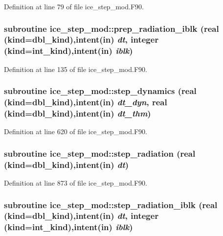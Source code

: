 Definition at line 79 of file ice\_\-step\_\-mod.F90.\hypertarget{namespaceice__step__mod_a39289f79dee62dcc8102504d118c616c}{
\subsubsection[{prep\_\-radiation\_\-iblk}]{\setlength{\rightskip}{0pt plus 5cm}subroutine ice\_\-step\_\-mod::prep\_\-radiation\_\-iblk (real (kind=dbl\_\-kind),intent(in) {\em dt}, \/  integer (kind=int\_\-kind),intent(in) {\em iblk})}}
\label{namespaceice__step__mod_a39289f79dee62dcc8102504d118c616c}


Definition at line 135 of file ice\_\-step\_\-mod.F90.\hypertarget{namespaceice__step__mod_a9b4ebd333313b56f42a75e8456969dd9}{
\subsubsection[{step\_\-dynamics}]{\setlength{\rightskip}{0pt plus 5cm}subroutine ice\_\-step\_\-mod::step\_\-dynamics (real (kind=dbl\_\-kind),intent(in) {\em dt\_\-dyn}, \/  real (kind=dbl\_\-kind),intent(in) {\em dt\_\-thm})}}
\label{namespaceice__step__mod_a9b4ebd333313b56f42a75e8456969dd9}


Definition at line 620 of file ice\_\-step\_\-mod.F90.\hypertarget{namespaceice__step__mod_a9e4459b869b4b233da16c02d6b92e975}{
\subsubsection[{step\_\-radiation}]{\setlength{\rightskip}{0pt plus 5cm}subroutine ice\_\-step\_\-mod::step\_\-radiation (real (kind=dbl\_\-kind),intent(in) {\em dt})}}
\label{namespaceice__step__mod_a9e4459b869b4b233da16c02d6b92e975}


Definition at line 873 of file ice\_\-step\_\-mod.F90.\hypertarget{namespaceice__step__mod_a9261563c1a6fee389549374e31fb0142}{
\subsubsection[{step\_\-radiation\_\-iblk}]{\setlength{\rightskip}{0pt plus 5cm}subroutine ice\_\-step\_\-mod::step\_\-radiation\_\-iblk (real (kind=dbl\_\-kind),intent(in) {\em dt}, \/  integer (kind=int\_\-kind),intent(in) {\em iblk})}}
\label{namespaceice__step__mod_a9261563c1a6fee389549374e31fb0142}


